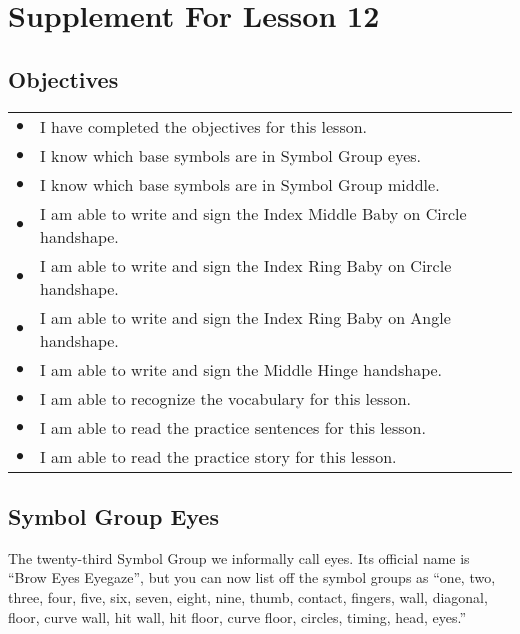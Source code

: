 \documentclass{article}
\begin{document}
\newfontfamily{}
\newfontfamily{}
\newcommand{\bul}{\hfil$\bullet$&}
\renewenvironment{glossary}{\begin{multicols}{5}\begin{center}}{\end{center}\end{multicols}}
\setcounter{secnumdepth}{0}
\setlength{\columnseprule}{1pt}

\section{Supplement For Lesson 12}

\subsection{Objectives}

\begin{tabular}{p{1cm}p{14cm}}
\bul I have completed the objectives for this lesson.\\
\bul I know which base symbols are in Symbol Group eyes.\\
\bul I know which base symbols are in Symbol Group middle.\\
\bul I am able to write and sign the Index Middle Baby on Circle handshape.\\
\bul I am able to write and sign the Index Ring Baby on Circle handshape.\\
\bul I am able to write and sign the Index Ring Baby on Angle handshape.\\
\bul I am able to write and sign the Middle Hinge handshape.\\
\bul I am able to recognize the vocabulary for this lesson.\\
\bul I am able to read the practice sentences for this lesson.\\
\bul I am able to read the practice story for this lesson.\\
\end{tabular}

\subsection{Symbol Group Eyes}

The twenty-third Symbol Group we informally call eyes.
Its official name is ``Brow Eyes Eyegaze'', but you can now list off the symbol groups as ``one, two, three, four, five, six, seven, eight, nine, thumb, contact, fingers, wall, diagonal, floor, curve wall, hit wall, hit floor, curve floor, circles, timing, head, eyes.''
\end{document}
